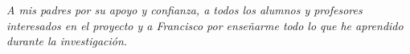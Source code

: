\thispagestyle{empty} 				

\begin{flushright}
    \textit{A mis padres por su apoyo y confianza, a todos los alumnos y profesores interesados en el proyecto y a Francisco por enseñarme todo lo que he aprendido durante la investigación.}
\end{flushright}